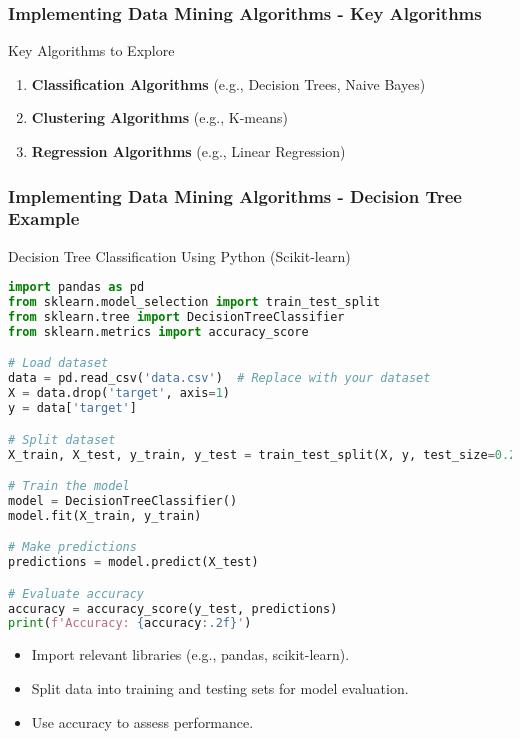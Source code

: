 \documentclass{beamer}
\begin{document}
\begin{frame}
    \frametitle{Implementing Data Mining Algorithms - Key Algorithms}
    \begin{block}{Key Algorithms to Explore}
        \begin{enumerate}
            \item \textbf{Classification Algorithms} (e.g., Decision Trees, Naive Bayes)
            \item \textbf{Clustering Algorithms} (e.g., K-means)
            \item \textbf{Regression Algorithms} (e.g., Linear Regression)
        \end{enumerate}
    \end{block}
\end{frame}

\begin{frame}[fragile]
    \frametitle{Implementing Data Mining Algorithms - Decision Tree Example}
    \begin{block}{Decision Tree Classification Using Python (Scikit-learn)}
        \begin{lstlisting}[language=Python]
import pandas as pd
from sklearn.model_selection import train_test_split
from sklearn.tree import DecisionTreeClassifier
from sklearn.metrics import accuracy_score

# Load dataset
data = pd.read_csv('data.csv')  # Replace with your dataset
X = data.drop('target', axis=1)
y = data['target']

# Split dataset
X_train, X_test, y_train, y_test = train_test_split(X, y, test_size=0.2, random_state=42)

# Train the model
model = DecisionTreeClassifier()
model.fit(X_train, y_train)

# Make predictions
predictions = model.predict(X_test)

# Evaluate accuracy
accuracy = accuracy_score(y_test, predictions)
print(f'Accuracy: {accuracy:.2f}')
        \end{lstlisting}
        \begin{itemize}
            \item Import relevant libraries (e.g., pandas, scikit-learn).
            \item Split data into training and testing sets for model evaluation.
            \item Use accuracy to assess performance.
        \end{itemize}
    \end{block}
\end{frame}
\end{document}
